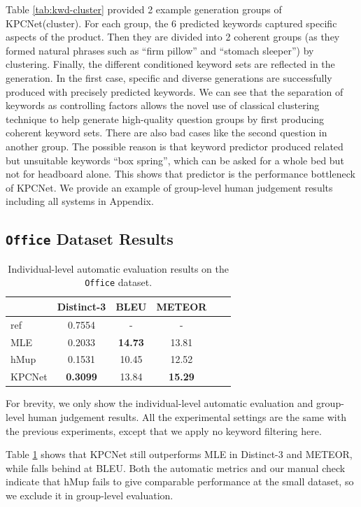 \documentclass[letterpaper]{article} %
\begin{document}
Table \ref{tab:kwd-cluster} provided 2 example generation groups of KPCNet(cluster). For each group, the 6 predicted keywords captured specific aspects of the product. Then they are divided into 2 coherent groups (as they formed natural phrases such as ``firm pillow'' and ``stomach sleeper'') by clustering. Finally, the different conditioned keyword sets are reflected in the generation. In the first case, specific and diverse generations are successfully produced with precisely predicted keywords. We can see that the separation of keywords as controlling factors allows the novel use of classical clustering technique to help generate high-quality question groups by first producing coherent keyword sets. There are also bad cases like the second question in another group. The possible reason is that keyword predictor produced related but unsuitable keywords ``box spring'', which can be asked for a whole bed but not for headboard alone. This shows that predictor is the performance bottleneck of KPCNet. We provide an example of group-level human judgement results including all systems in Appendix.

\subsection{\texttt{Office} Dataset Results}


\begin{table}[h]
  \centering
  \small
  \begin{tabular}{l|ccccc}
  \hline
  {} & Distinct-3 & BLEU & METEOR \\
  \hline
  ref  &        0.7554 &        - &    - \\
  \hline
  MLE &        0.2033 &  \textbf{14.73} & 13.81 \\
  hMup &        0.1531 &  10.45 &    12.52  \\
  KPCNet &        \textbf{0.3099} &     13.84 &    \textbf{15.29}  \\
  \hline
  \end{tabular}
  \caption{\label{tab:ind-auto-eval-office} Individual-level automatic evaluation results on the \texttt{Office} dataset.}
\end{table}

For brevity, we only show the individual-level automatic evaluation and group-level human judgement results. All the experimental settings are the same with the previous experiments, except that we apply no keyword filtering here. 

Table \ref{tab:ind-auto-eval-office} shows that KPCNet still outperforms MLE in Distinct-3 and METEOR, while falls behind at BLEU. Both the automatic metrics and our manual check indicate that hMup fails to give comparable performance at the small dataset, so we exclude it in group-level evaluation. 
\end{document}
